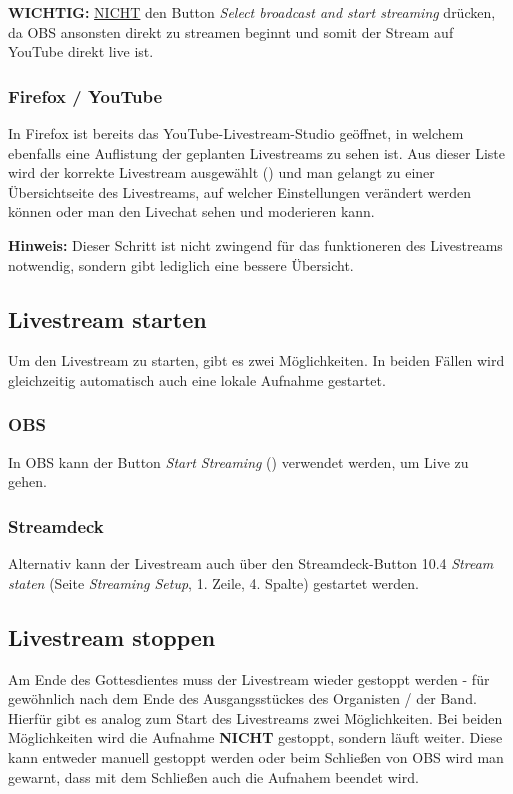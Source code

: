 				\textbf{WICHTIG:} \underline{NICHT} den Button \textit{Select broadcast and start streaming} drücken, da \Gls{OBS} ansonsten direkt zu streamen beginnt und somit der Stream auf YouTube direkt live ist.
			\subsubsection{Firefox / YouTube}
				In Firefox ist bereits das YouTube-Livestream-Studio geöffnet, in welchem ebenfalls eine Auflistung der geplanten Livestreams zu sehen ist.
				Aus dieser Liste wird der korrekte Livestream ausgewählt () und man gelangt zu einer Übersichtseite des Livestreams, auf welcher Einstellungen verändert werden können oder man den Livechat sehen und moderieren kann.

				\textbf{Hinweis:} Dieser Schritt ist nicht zwingend für das funktioneren des Livestreams notwendig, sondern gibt lediglich eine bessere Übersicht.
		\subsection{Livestream starten}
			Um den Livestream zu starten, gibt es zwei Möglichkeiten.
			In beiden Fällen wird gleichzeitig automatisch auch eine lokale Aufnahme gestartet.
			\subsubsection{OBS}
				In \Gls{OBS} kann der Button \textit{Start Streaming} () verwendet werden, um Live zu gehen.
			\subsubsection{Streamdeck}
				Alternativ kann der Livestream auch über den Streamdeck-Button 10.4 \textit{Stream staten} (Seite \textit{Streaming Setup}, 1. Zeile, 4. Spalte) gestartet werden.
		\subsection{Livestream stoppen}
			Am Ende des Gottesdientes muss der Livestream wieder gestoppt werden - für gewöhnlich nach dem Ende des Ausgangsstückes des Organisten / der Band.
			Hierfür gibt es analog zum Start des Livestreams zwei Möglichkeiten.
			Bei beiden Möglichkeiten wird die Aufnahme \textbf{NICHT} gestoppt, sondern läuft weiter.
			Diese kann entweder manuell gestoppt werden oder beim Schließen von \Gls{OBS} wird man gewarnt, dass mit dem Schließen auch die Aufnahem beendet wird.
